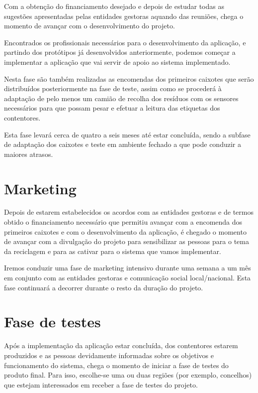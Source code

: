 \documentclass[11pt, a4paper, oneside]{book}
\begin{document}
Com a obtenção do financiamento desejado e depois de estudar todas as sugestões apresentadas pelas entidades gestoras aquando das reuniões, chega o momento de avançar com o desenvolvimento do projeto.

Encontrados os profissionais necessários para o desenvolvimento da aplicação, e partindo dos protótipos já desenvolvidos anteriormente, podemos começar a implementar a aplicação que vai servir de apoio ao sistema implementado.

Nesta fase são também realizadas as encomendas dos primeiros caixotes que serão distribuídos posteriormente na fase de teste, assim como se procederá à adaptação de pelo menos um camião de recolha dos resíduos com os sensores necessários para que possam pesar e efetuar a leitura das etiquetas dos contentores.

Esta fase levará cerca de quatro a seis meses até estar concluída, sendo a subfase de adaptação dos caixotes e teste em ambiente fechado a que pode conduzir a maiores atrasos.

\section{Marketing}

Depois de estarem estabelecidos os acordos com as entidades gestoras e de termos obtido o financiamento necessário que permitiu avançar com a encomenda dos primeiros caixotes e com o desenvolvimento da aplicação, é chegado o momento de avançar com a divulgação do projeto para sensibilizar as pessoas para o tema da reciclagem e para as cativar para o sistema que vamos implementar. 

Iremos conduzir uma fase de marketing intensivo durante uma semana a um mês em conjunto com as entidades gestoras e comunicação social local/nacional. Esta fase continuará a decorrer durante o resto da duração do projeto.

\section{Fase de testes}

Após a implementação da aplicação estar concluída, dos contentores estarem produzidos e as pessoas devidamente informadas sobre os objetivos e funcionamento do sistema, chega o momento de iniciar a fase de testes do produto final. Para isso, escolhe-se uma ou duas regiões (por exemplo, concelhos) que estejam interessados em receber a fase de testes do projeto.
\end{document}
